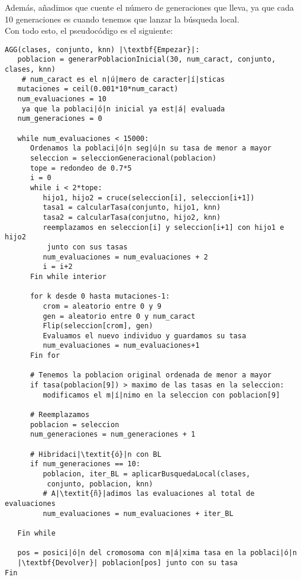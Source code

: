 \documentclass[12pt]{article}
\begin{document}
Además, añadimos que cuente el número de generaciones que lleva, ya que cada 10 generaciones es cuando tenemos que lanzar la búsqueda local.\\

Con todo esto, el pseudocódigo es el siguiente:
\begin{lstlisting}
AGG(clases, conjunto, knn) |\textbf{Empezar}|:
   poblacion = generarPoblacionInicial(30, num_caract, conjunto, clases, knn)
    # num_caract es el n|ú|mero de caracter|í|sticas
   mutaciones = ceil(0.001*10*num_caract)
   num_evaluaciones = 10
    ya que la poblaci|ó|n inicial ya est|á| evaluada
   num_generaciones = 0
   
   while num_evaluaciones < 15000:
      Ordenamos la poblaci|ó|n seg|ú|n su tasa de menor a mayor
      seleccion = seleccionGeneracional(poblacion)
      tope = redondeo de 0.7*5
      i = 0
      while i < 2*tope:
         hijo1, hijo2 = cruce(seleccion[i], seleccion[i+1])
         tasa1 = calcularTasa(conjunto, hijo1, knn)
         tasa2 = calcularTasa(conjutno, hijo2, knn)
         reemplazamos en seleccion[i] y seleccion[i+1] con hijo1 e hijo2
          junto con sus tasas
         num_evaluaciones = num_evaluaciones + 2
         i = i+2
      Fin while interior
      
      for k desde 0 hasta mutaciones-1:
         crom = aleatorio entre 0 y 9
         gen = aleatorio entre 0 y num_caract
         Flip(seleccion[crom], gen)
         Evaluamos el nuevo individuo y guardamos su tasa
         num_evaluaciones = num_evaluaciones+1
      Fin for
      
      # Tenemos la poblacion original ordenada de menor a mayor
      if tasa(poblacion[9]) > maximo de las tasas en la seleccion:
         modificamos el m|í|nimo en la seleccion con poblacion[9]
      
      # Reemplazamos
      poblacion = seleccion
      num_generaciones = num_generaciones + 1
      
      # Hibridaci|\textit{ó}|n con BL
      if num_generaciones == 10:  
         poblacion, iter_BL = aplicarBusquedaLocal(clases,
          conjunto, poblacion, knn)    
         # A|\textit{ñ}|adimos las evaluaciones al total de evaluaciones
         num_evaluaciones = num_evaluaciones + iter_BL
      
   Fin while
   
   pos = posici|ó|n del cromosoma con m|á|xima tasa en la poblaci|ó|n
   |\textbf{Devolver}| poblacion[pos] junto con su tasa
Fin

\end{lstlisting}
\end{document}
